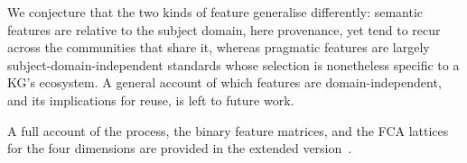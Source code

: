 \documentclass[runningheads]{llncs}
\newenvironment{onlyshort}{\ignorespaces}{\ignorespacesafterend}
\newenvironment{inboth}{}{}
\begin{document}
\begin{inboth}
\begin{sloppypar}
We conjecture that the two kinds of feature generalise differently: semantic features are relative to the subject domain, here provenance, yet tend to recur across the communities that share it, whereas pragmatic features are largely subject-domain-independent standards whose selection is nonetheless specific to a KG's ecosystem.
A general account of which features are domain-independent, and its implications for reuse, is left to future work.\end{sloppypar}
\end{inboth}
\begin{onlyshort}
A full account of the process, the binary feature matrices, and the FCA lattices for the four dimensions are provided in the extended version~\cite{continuumex}.
\end{onlyshort}
\end{document}
